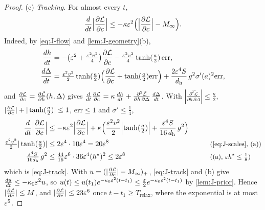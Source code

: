 \begin{proof}
\noindent(c) \emph{Tracking.} For almost every $t$,
\begin{equation}
 \frac{d}{dt}\Bigl|\pd{\mathcal L}{c}\Bigr|\le-\kappa\initscale^2\Bigl(\Bigl|\pd{\mathcal L}{c}\Bigr|-M_\infty\Bigr).
 \label{eq:J-track}
\end{equation}
Indeed, by \cref{eq:J-flow} and \cref{lem:J-geometry}(b),
\begin{align*}
 \ddt{h}&=-\bigl(\initscale^2+\tfrac{\initscale^2v^2}{4}\bigr) \pd{\mathcal L}{c}-\tfrac{\initscale^2v^2}{4}\tanh(\tfrac{a}{2})\,\mathrm{err},\\
 \ddt{\Delta}&=\tfrac{\initscale^2v^2}{2}\tanh(\tfrac{a}{2})\Bigl( \pd{\mathcal L}{c}+\tanh(\tfrac{a}{2})\mathrm{err}\Bigr)+\frac{2\initscale^4S}{d_{\mathrm h}}\,g^2\sigma'(a)^2\mathrm{err},
\end{align*}
and $\pd{\mathcal L}{c}=\pd{\tilde{\mathcal L}}{h}(h,\Delta)$ gives $\frac{d}{dt}\pd{\mathcal L}{c}=\kappa\,\ddt{h}+\frac{\partial^2\tilde{\mathcal L}}{\partial h\,\partial\Delta}\,\ddt{\Delta}$. With
$|\frac{\partial^2\tilde{\mathcal L}}{\partial h\,\partial\Delta}|\le\frac{\kappa}{2}$, $|\pd{\mathcal L}{c}|+|\tanh(\frac{a}{2})|\le1$, $\mathrm{err}\le1$ and $\sigma'\le\frac{1}{4}$,
\begin{alignat*}{2}
 \frac{d}{dt}\Bigl|\pd{\mathcal L}{c}\Bigr|&\le-\kappa\initscale^2\Bigl|\pd{\mathcal L}{c}\Bigr|+\kappa\Bigl(\frac{\initscale^2v^2}{2}\Bigl|\tanh(\tfrac{a}{2})\Bigr|+\frac{\initscale^4S}{16\,d_{\mathrm h}}\,g^2\Bigr) &\qquad& \\
 \tfrac{\initscale^2v^2}{2}|\tanh(\tfrac{a}{2})|&\le2\initscale^4\cdot10\initscale^4=20\initscale^8 && \why{\cref{eq:J-scales}, (a)}\\
 \tfrac{\initscale^4S}{16d_{\mathrm h}}\,g^2&\le\tfrac{44}{16}\initscale^6\cdot36\initscale^4(h^\star)^2\le2\initscale^8 && \why{(a), $\initscale h^\star\le\tfrac{1}{8}$}
\end{alignat*}
which is \cref{eq:J-track}. With $u=(|\pd{\mathcal L}{c}|-M_\infty)_+$, \cref{eq:J-track} and (b) give $\ddt{u}\le-\kappa_0\initscale^2u$, so
$u(t)\le u(t_1)e^{-\kappa_0\varepsilon^2(t-t_1)}\le\frac{\varepsilon}{2}e^{-\kappa_0\varepsilon^2(t-t_1)}$ by \cref{lem:J-prior}. Hence $|\pd{\mathcal L}{c}|\le M$, and
$|\pd{\mathcal L}{c}|\le23\initscale^6$ once $t-t_1\ge T_{\mathrm{relax}}$, where the exponential is at most $\varepsilon^5$.


\end{proof}

